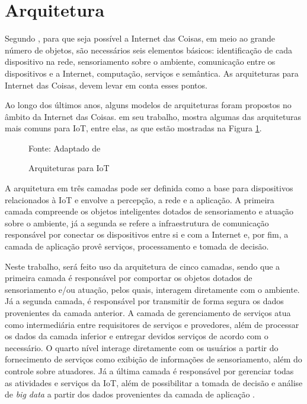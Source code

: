 \section{Arquitetura}

Segundo , para que seja possível a Internet das Coisas, em meio ao grande número de objetos, são necessários seis elementos básicos: identificação de cada dispositivo na rede, sensoriamento sobre o ambiente, comunicação entre os dispositivos e a Internet, computação, serviços e semântica. As arquiteturas para Internet das Coisas, devem levar em conta esses pontos.

Ao longo dos últimos anos, alguns modelos de arquiteturas foram propostos no âmbito da Internet das Coisas.  em seu trabalho, mostra algumas das arquiteturas mais comuns para IoT, entre elas, as que estão mostradas na Figura \ref{fig:cap2_arquiteturas}.
\begin{figure}[htb]
	\caption{Arquiteturas para IoT}
	
	Fonte: Adaptado de 
	\label{fig:cap2_arquiteturas}
\end{figure}

A arquitetura em três camadas pode ser definida como a base para dispositivos relacionados à IoT e envolve a  percepção, a rede e a aplicação. A primeira camada compreende os objetos inteligentes dotados de sensoriamento e atuação sobre o ambiente, já a segunda se refere a infraestrutura de comunicação responsável por conectar os dispositivos entre si e com a Internet e, por fim, a camada de aplicação provê serviços, processamento e tomada de decisão.  

Neste trabalho, será feito uso da arquitetura de cinco camadas, sendo que a primeira camada é responsável por comportar os objetos dotados de sensoriamento e/ou atuação, pelos quais, interagem diretamente com o ambiente. Já a segunda camada, é responsável por transmitir de forma segura os dados provenientes da camada anterior. A camada de gerenciamento de serviços atua como intermediária entre requisitores de serviços e provedores, além de processar os dados da camada inferior e entregar devidos serviços de acordo com o necessário. O quarto nível interage diretamente com os usuários a partir do fornecimento de serviços como exibição de informações de sensoriamento, além do controle sobre atuadores. Já a última camada é responsável por gerenciar todas as atividades e serviços da IoT, além de possibilitar a tomada de decisão e análise de \textit{big data} a partir dos dados provenientes da camada de aplicação \cite{Al-Fuqaha2015}.

